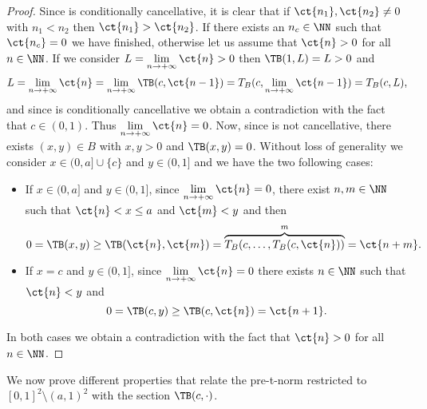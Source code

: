 \begin{proof}
	Since \TB is conditionally cancellative, it is clear that if $\ct{n_1},\ct{n_2} \not = 0$ with $n_1 < n_2$ then $\ct{n_1}>\ct{n_2}$. If there exists an $n_c \in \NN$ such that $\ct{n_c}=0$ we have finished, otherwise let us assume that $\ct{n}>0$ for all $n \in \NN$. If we consider $\displaystyle L= \lim_{n \to + \infty} \ct{n}>0$ then $\TB(1,L)=L>0$ and
	$$L= \lim_{n \to +\infty} \ct{n} = \lim_{n \to +\infty} \TB (c,\ct{n-1}) = T_B(c,\lim_{n \to +\infty} \ct{n-1}) = T_B(c,L),$$
	and since \TB is conditionally cancellative we obtain a contradiction with the fact that $c \in (0,1)$. Thus $\displaystyle \lim_{n \to +\infty} \ct{n}=0$. Now, since \TB is not cancellative, there exists $(x,y) \in B$ with $x,y>0$ and $\TB(x,y)=0$. Without loss of generality we consider $x \in (0,a] \cup \{c\}$ and $y \in (0,1]$ and we have the two following cases:
	\begin{itemize}
		\item If $x \in (0,a]$ and $y \in (0,1]$, since $\displaystyle \lim_{n \to +\infty} \ct{n}=0$, there exist $n,m \in \NN$ such that $\ct{n}<x \leq a$ and $\ct{m} <y$ and then
		$$0=\TB(x,y) \geq \TB(\ct{n},\ct{m}) = \overbrace{T_B(c,\dots, T_B(c,\ct{n}))}^m =\ct{n+m}.$$
		\item If $x=c$ and $y \in (0,1]$, since $\displaystyle \lim_{n \to +\infty} \ct{n}=0$ there exists $n \in \NN$ such that $\ct{n}<y$ and
		$$0=\TB(c,y) \geq \TB(c,\ct{n})=\ct{n+1}.$$
	\end{itemize}
	In both cases we obtain a contradiction with the fact that $\ct{n}>0$ for all $n \in \NN$.
\end{proof}

We now prove different properties that relate the pre-t-norm \TB restricted to $[0,1]^2 \setminus (a,1)^2$ with the section $\TB(c,\cdot)$.

